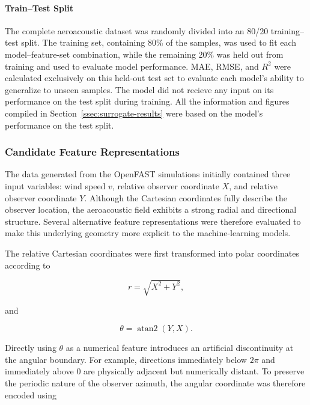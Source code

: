 \documentclass[11pt]{article}
\begin{document}
\paragraph{Train--Test Split}

The complete aeroacoustic dataset was randomly divided into an 80/20 training--test split. The training set, containing 80\% of the samples, was used to fit each model--feature-set combination, while the remaining 20\% was held out from training and used to evaluate model performance. MAE, RMSE, and $R^2$ were calculated exclusively on this held-out test set to evaluate each model's ability to generalize to unseen samples. The model did not recieve any input on its performance on the test split during training. All the information and figures compiled in Section~\ref{ssec:surrogate-results} were based on the model's performance on the test split.

\subsubsection{Candidate Feature Representations}

The data generated from the OpenFAST simulations initially contained three input variables: wind speed $v$, relative observer coordinate $X$, and relative observer coordinate $Y$. Although the Cartesian coordinates fully describe the observer location, the aeroacoustic field exhibits a strong radial and directional structure. Several alternative feature representations were therefore evaluated to make this underlying geometry more explicit to the machine-learning models.

The relative Cartesian coordinates were first transformed into polar coordinates according to

\begin{equation}
    r = \sqrt{X^2 + Y^2},
\end{equation}

and

\begin{equation}
    \theta = \operatorname{atan2}(Y,X).
\end{equation}

Directly using $\theta$ as a numerical feature introduces an artificial discontinuity at the angular boundary. For example, directions immediately below $2\pi$ and immediately above $0$ are physically adjacent but numerically distant. To preserve the periodic nature of the observer azimuth, the angular coordinate was therefore encoded using
\end{document}
